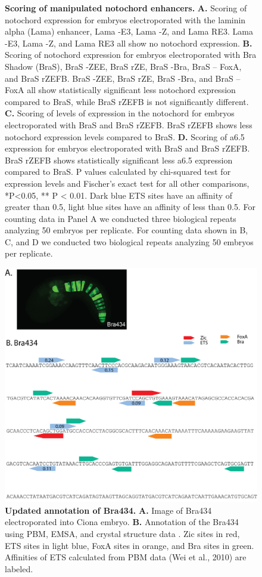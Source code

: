 \begin{figure}[p]
    \caption[Scoring of manipulated notochord enhancers]{\textbf{Scoring of manipulated notochord enhancers.} \textbf{A.} Scoring of notochord expression for embryos electroporated with the laminin alpha (Lama) enhancer, Lama -E3, Lama -Z, and Lama RE3. Lama -E3, Lama -Z, and Lama RE3 all show no notochord expression. \textbf{B.} Scoring of notochord expression for embryos electroporated with Bra Shadow (BraS), BraS -ZEE, BraS rZE, BraS -Bra, BraS – FoxA, and BraS rZEFB. BraS -ZEE, BraS rZE, BraS -Bra, and BraS –FoxA all show statistically significant less notochord expression compared to BraS, while BraS rZEFB is not significantly different. \textbf{C.} Scoring of levels of expression in the notochord for embryos electroporated with BraS and BraS rZEFB. BraS rZEFB shows less notochord expression levels compared to BraS. \textbf{D.} Scoring of a6.5 expression for embryos electroporated with BraS and BraS rZEFB. BraS rZEFB shows statistically significant less a6.5 expression compared to BraS. P values calculated by chi-squared test for expression levels and Fischer’s exact test for all other comparisons, *P<0.05, ** P < 0.01. Dark blue ETS sites have an affinity of greater than 0.5, light blue sites have an affinity of less than 0.5. For counting data in Panel A we conducted three biological repeats analyzing 50 embryos per replicate. For counting data shown in B, C, and D we conducted two biological repeats analyzing 50 embryos per replicate.}
\end{figure}

\begin{figure}[p]
    \centering
    \includegraphics[scale=.75]{2_figures/FigS6_Bra434-Dissection.png}
    \caption[Updated annotation of Bra434]{\textbf{Updated annotation of Bra434.} \textbf{A.} Image of Bra434 electroporated into Ciona embryo. \textbf{B.} Annotation of the Bra434 using PBM, EMSA, and crystal structure data . Zic sites in red, ETS sites in light blue, FoxA sites in orange, and Bra sites in green. Affinities of ETS calculated from PBM data (Wei et al., 2010) are labeled.}
\end{figure}

